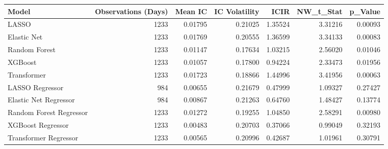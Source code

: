 \begin{tabular}{lrrrrrr}
\toprule
Model & Observations (Days) & Mean IC & IC Volatility & ICIR & NW_t_Stat & p_Value \\
\midrule
LASSO & 1233 & 0.01795 & 0.21025 & 1.35524 & 3.31216 & 0.00093 \\
Elastic Net & 1233 & 0.01769 & 0.20555 & 1.36599 & 3.34133 & 0.00083 \\
Random Forest & 1233 & 0.01147 & 0.17634 & 1.03215 & 2.56020 & 0.01046 \\
XGBoost & 1233 & 0.01057 & 0.17800 & 0.94224 & 2.33473 & 0.01956 \\
Transformer & 1233 & 0.01723 & 0.18866 & 1.44996 & 3.41956 & 0.00063 \\
LASSO Regressor & 984 & 0.00655 & 0.21679 & 0.47999 & 1.09327 & 0.27427 \\
Elastic Net Regressor & 984 & 0.00867 & 0.21263 & 0.64760 & 1.48427 & 0.13774 \\
Random Forest Regressor & 1233 & 0.01272 & 0.19255 & 1.04850 & 2.58291 & 0.00980 \\
XGBoost Regressor & 1233 & 0.00483 & 0.20703 & 0.37066 & 0.99049 & 0.32193 \\
Transformer Regressor & 1233 & 0.00565 & 0.20996 & 0.42687 & 1.01961 & 0.30791 \\
\bottomrule
\end{tabular}
